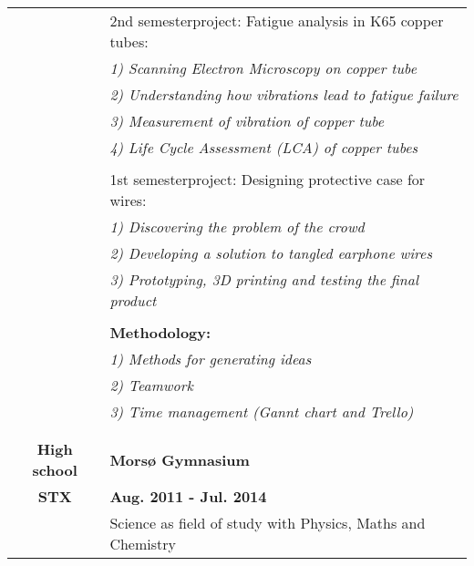 \documentclass[letterpaper]{twentysecondcv} %
\begin{document}
\begin{tabular}{c|l}
    & \hphantom{m}  2nd semesterproject: Fatigue analysis in K65 copper tubes:              \\
       & \hphantom{mmm} \textit{1) Scanning Electron Microscopy on copper tube}             \\
       & \hphantom{mmm} \textit{2) Understanding how vibrations lead to fatigue failure}    \\
       & \hphantom{mmm} \textit{3) Measurement of vibration of copper tube}                 \\
       & \hphantom{mmm} \textit{4) Life Cycle Assessment (LCA) of copper tubes}             \\ \\
    & \hphantom{m}  1st semesterproject: Designing protective case for wires:               \\
       & \hphantom{mmm} \textit{1) Discovering the problem of the crowd}                    \\
       & \hphantom{mmm} \textit{2) Developing a solution to tangled earphone wires}         \\
       & \hphantom{mmm} \textit{3) Prototyping, 3D printing and testing the final product}               \\ \\
    & \hphantom{m} \textbf{Methodology:}                                                    \\             
       & \hphantom{mmm} \textit{1) Methods for generating ideas }                           \\
       & \hphantom{mmm} \textit{2) Teamwork }                                               \\         
       & \hphantom{mmm} \textit{3) Time management (Gannt chart and Trello)}                \\ \multicolumn{2}{c}{}\\                                                                 \\
 \textbf{High school}    & \normalsize\textbf{Morsø Gymnasium}                                       \\
 \textbf{STX}            & \textbf{Aug. 2011 - Jul. 2014}                                            \\
                                    & Science as field of study with Physics, Maths and Chemistry   \\
\end{tabular}
\vspace{1cm}
\end{document}
